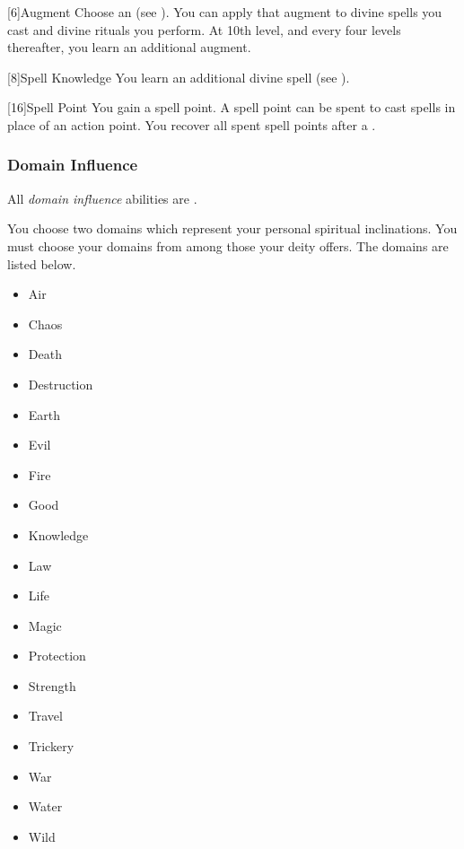             [6]{Augment}
            Choose an  (see ).
            You can apply that augment to divine spells you cast and divine rituals you perform.
            At 10th level, and every four levels thereafter, you learn an additional augment.

            [8]{Spell Knowledge}
            You learn an additional divine spell (see ).

            [16]{Spell Point} 
            You gain a spell point.
            A spell point can be spent to cast spells in place of an action point.
            You recover all spent spell points after a .

        \subsubsection{Domain Influence}
            All \textit{domain influence} abilities are .

            You choose two domains which represent your personal spiritual inclinations.
            You must choose your domains from among those your deity offers.
            The domains are listed below.

            \begin{itemize}
                \item{Air}
                \item{Chaos}
                \item{Death}
                \item{Destruction}
                \item{Earth}
                \item{Evil}
                \item{Fire}
                \item{Good}
                \item{Knowledge}
                \item{Law}
                \item{Life}
                \item{Magic}
                \item{Protection}
                \item{Strength}
                \item{Travel}
                \item{Trickery}
                \item{War}
                \item{Water}
                \item{Wild}
            \end{itemize}

